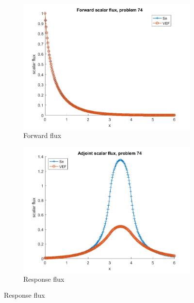 \documentclass{article}
\begin{document}
\begin{figure}[H]
\label{Case74Flux}
\centering
\begin{subfigure}{.5\textwidth}
  \centering
  \includegraphics[width=.98\linewidth]{IanProposal/figures2/74phi.png}
  \caption{Forward flux}
  \label{fig:sfig1}
\end{subfigure}%
\begin{subfigure}{.5\textwidth}
  \centering
  \includegraphics[width=.98\linewidth]{IanProposal/figures2/74phia.png}
  \caption{Response flux}
  \label{fig:sfig4}
\end{subfigure}%
\end{figure}
\end{document}
